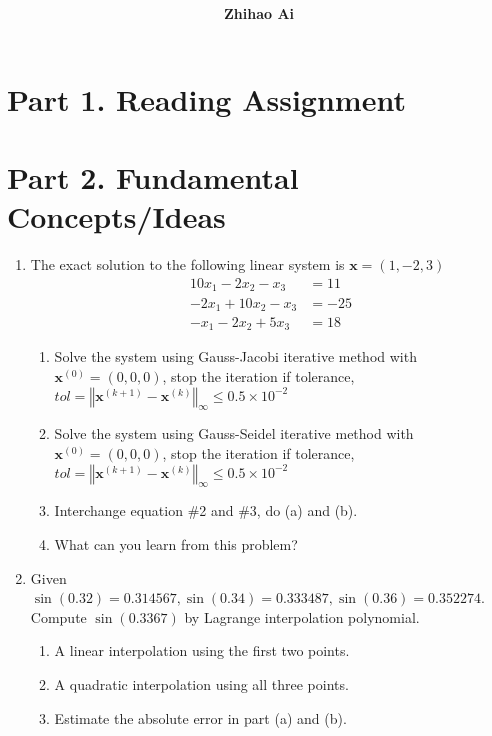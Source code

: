 \documentclass[10pt]{report}
\title{
	\vspace{2in}
	\textmd{\textbf{\hwCourse\\\hwTitle}}\\
	\vspace{0.3in}\large{\textit{\hmwkClassInstructor}}
	\vspace{3in}
}
\author{\textbf{Zhihao Ai}}
\date{}
\newcommand{\norm}[2][\infty] {\left\Vert \mathbf{#2} \right\Vert_#1}
\begin{document}
\maketitle

\section*{Part 1. Reading Assignment}

\section*{Part 2. Fundamental Concepts/Ideas}
\begin{enumerate}
	\item 
	The exact solution to the following linear system is $\mathbf{x} = (1, -2, 3)$
	\begin{align*}
		10x_1 - 2x_2 - x_3 &= 11\\
		-2x_1 + 10x_2 - x_3 &= -25\\
		-x_1 - 2x_2 + 5x_3 &= 18
	\end{align*}
	\begin{enumerate}
		\item 
		Solve the system using Gauss-Jacobi iterative method with $\mathbf{x}^{(0)} = (0, 0, 0)$, stop the iteration if tolerance, $tol = \norm{x^{(\mathit k + \mathrm 1)} - x^{(\mathit{k})}} \le 0.5\times 10^{-2}$
		
		\item 
		Solve the system using Gauss-Seidel iterative method with $\mathbf{x}^{(0)} = (0, 0, 0)$, stop the iteration if tolerance, $tol = \norm{x^{(\mathit k + \mathrm 1)} - x^{(\mathit{k})}} \le 0.5\times 10^{-2}$
		
		\item 
		Interchange equation \#2 and \#3, do (a) and (b).
		
		\item 
		What can you learn from this problem?
	\end{enumerate}

	\item 
	Given $\sin(0.32)=0.314567, \sin(0.34)=0.333487, \sin(0.36)=0.352274$. Compute $\sin(0.3367)$ by Lagrange interpolation polynomial.
	\begin{enumerate}
		\item 
		A linear interpolation using the first two points.
		
		\item 
		A quadratic interpolation using all three points.
		
		\item 
		Estimate the absolute error in part (a) and (b).
	\end{enumerate}
\end{enumerate}
\end{document}
